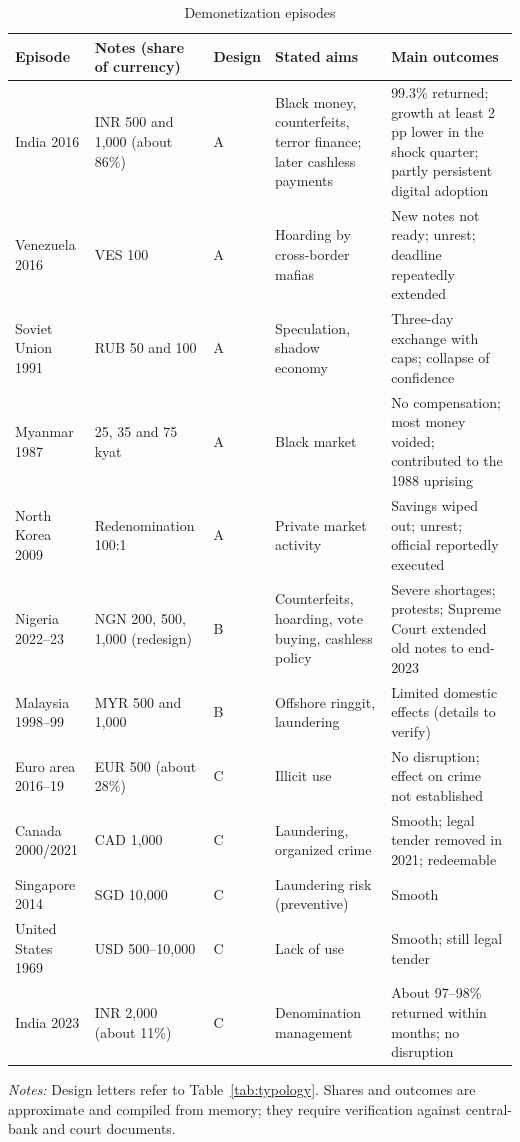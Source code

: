 \documentclass[11pt]{article}
\theoremstyle{definition}
\theoremstyle{remark}
\begin{document}
\begin{table}[!htbp]\centering\footnotesize
\caption{Demonetization episodes}\label{tab:episodes}
\begin{threeparttable}
\begin{tabularx}{\textwidth}{@{}p{2.3cm}p{3.2cm}p{1.6cm}YY@{}}
\toprule
Episode & Notes (share of currency) & Design & Stated aims & Main outcomes\\
\midrule
India 2016 & INR 500 and 1,000 (about 86\%) & A & Black money, counterfeits, terror finance; later cashless
payments & 99.3\% returned; growth at least 2 pp lower in the shock quarter; partly persistent digital adoption\\
Venezuela 2016 & VES 100 & A & Hoarding by cross-border mafias & New notes not ready; unrest; deadline repeatedly
extended\\
Soviet Union 1991 & RUB 50 and 100 & A & Speculation, shadow economy & Three-day exchange with caps; collapse of
confidence\\
Myanmar 1987 & 25, 35 and 75 kyat & A & Black market & No compensation; most money voided; contributed to the 1988
uprising\\
North Korea 2009 & Redenomination 100:1 & A & Private market activity & Savings wiped out; unrest; official reportedly
executed\\
Nigeria 2022--23 & NGN 200, 500, 1,000 (redesign) & B & Counterfeits, hoarding, vote buying, cashless policy & Severe
shortages; protests; Supreme Court extended old notes to end-2023\\
Malaysia 1998--99 & MYR 500 and 1,000 & B & Offshore ringgit, laundering & Limited domestic effects (details to
verify)\\
Euro area 2016--19 & EUR 500 (about 28\%) & C & Illicit use & No disruption; effect on crime not established\\
Canada 2000/2021 & CAD 1,000 & C & Laundering, organized crime & Smooth; legal tender removed in 2021; redeemable\\
Singapore 2014 & SGD 10,000 & C & Laundering risk (preventive) & Smooth\\
United States 1969 & USD 500--10,000 & C & Lack of use & Smooth; still legal tender\\
India 2023 & INR 2,000 (about 11\%) & C & Denomination management & About 97--98\% returned within months; no disruption\\
\bottomrule
\end{tabularx}
\begin{tablenotes}\scriptsize
\item \textit{Notes:} Design letters refer to Table~\ref{tab:typology}. Shares and outcomes are approximate and compiled
from memory; they require verification against central-bank and court documents.
\end{tablenotes}
\end{threeparttable}
\end{table}
\end{document}
